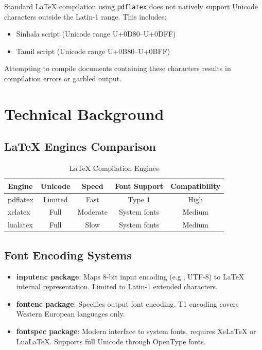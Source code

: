 \documentclass[11pt,a4paper]{article}
\begin{document}
Standard LaTeX compilation using \texttt{pdflatex} does not natively support Unicode characters outside the Latin-1 range. This includes:
\begin{itemize}
    \item Sinhala script (Unicode range U+0D80--U+0DFF)
    \item Tamil script (Unicode range U+0B80--U+0BFF)
\end{itemize}

Attempting to compile documents containing these characters results in compilation errors or garbled output.

\section{Technical Background}

\subsection{LaTeX Engines Comparison}

\begin{table}[htbp]
\centering
\caption{LaTeX Compilation Engines}
\begin{tabular}{@{}lcccc@{}}
\toprule
\textbf{Engine} & \textbf{Unicode} & \textbf{Speed} & \textbf{Font Support} & \textbf{Compatibility} \\ \midrule
pdflatex & Limited & Fast & Type 1 & High \\
xelatex & Full & Moderate & System fonts & Medium \\
lualatex & Full & Slow & System fonts & Medium \\
\bottomrule
\end{tabular}
\end{table}

\subsection{Font Encoding Systems}

\begin{itemize}
    \item \textbf{inputenc package}: Maps 8-bit input encoding (e.g., UTF-8) to LaTeX internal representation. Limited to Latin-1 extended characters.
    
    \item \textbf{fontenc package}: Specifies output font encoding. T1 encoding covers Western European languages only.
    
    \item \textbf{fontspec package}: Modern interface to system fonts, requires XeLaTeX or LuaLaTeX. Supports full Unicode through OpenType fonts.
\end{itemize}
\end{document}
